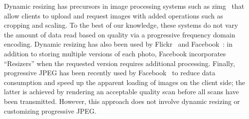 Dynamic resizing has precursors in image processing systems such as zimg~\cite{zimg} that allow clients to upload and request images with added operations such as cropping and scaling. 
To the best of our knowledge, these systems do not vary the amount of data read based on quality via a progressive frequency domain encoding.
Dynamic resizing has also been used by Flickr~\cite{flickr} and Facebook~\cite{huang2013analysis}: in addition to storing multiple versions of each photo, Facebook incorporates ``Resizers'' when the requested version requires additional processing.
Finally, progressive JPEG has been recently used by Facebook~\cite{fasterfacebook} to reduce data consumption and speed up the apparent loading of images on the client side; the latter is achieved by rendering an acceptable quality scan before all scans have been transmitted. However, this approach does not involve dynamic resizing or customizing progressive JPEG\@.
